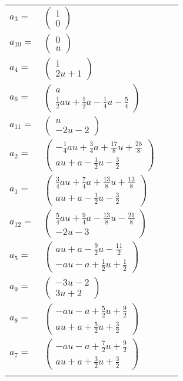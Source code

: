 \documentclass[1p]{elsarticle_modified}
\theoremstyle{definition}
\begin{document}
\begin{tabular}{m{7pt} m{180pt} m{7pt} m{180pt} }
\flushright $a_{3}=$&$\begin{pmatrix}1\\0\end{pmatrix}$ \\
\flushright $a_{10}=$&$\begin{pmatrix}0\\u\end{pmatrix}$ \\
\flushright $a_{4}=$&$\begin{pmatrix}1\\2 u+1\end{pmatrix}$ \\
\flushright $a_{6}=$&$\begin{pmatrix}a\\\frac{1}{2} a u+\frac{1}{2} a-\frac{1}{4} u-\frac{5}{4}\end{pmatrix}$ \\
\flushright $a_{11}=$&$\begin{pmatrix}u\\-2 u-2\end{pmatrix}$ \\
\flushright $a_{2}=$&$\begin{pmatrix}-\frac{1}{4} a u+\frac{3}{4} a+\frac{17}{8} u+\frac{25}{8}\\a u+a-\frac{1}{2} u-\frac{3}{2}\end{pmatrix}$ \\
\flushright $a_{1}=$&$\begin{pmatrix}\frac{3}{4} a u+\frac{7}{4} a+\frac{13}{8} u+\frac{13}{8}\\a u+a-\frac{1}{2} u-\frac{3}{2}\end{pmatrix}$ \\
\flushright $a_{12}=$&$\begin{pmatrix}\frac{5}{4} a u+\frac{9}{4} a-\frac{13}{8} u-\frac{21}{8}\\-2 u-3\end{pmatrix}$ \\
\flushright $a_{5}=$&$\begin{pmatrix}a u+a-\frac{9}{2} u-\frac{11}{2}\\- a u- a+\frac{1}{2} u+\frac{1}{2}\end{pmatrix}$ \\
\flushright $a_{9}=$&$\begin{pmatrix}-3 u-2\\3 u+2\end{pmatrix}$ \\
\flushright $a_{8}=$&$\begin{pmatrix}- a u- a+\frac{5}{2} u+\frac{9}{2}\\a u+a+\frac{5}{2} u+\frac{3}{2}\end{pmatrix}$ \\
\flushright $a_{7}=$&$\begin{pmatrix}- a u- a+\frac{7}{2} u+\frac{9}{2}\\a u+a+\frac{3}{2} u+\frac{3}{2}\end{pmatrix}$\\&\end{tabular}
\end{document}
